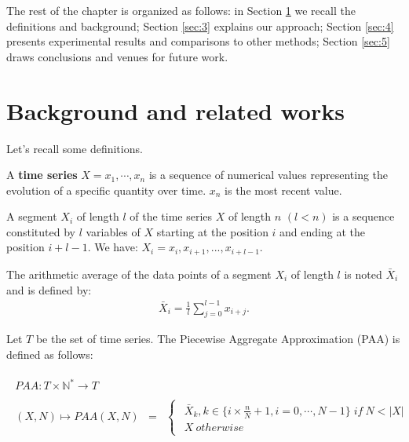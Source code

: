 The rest of the chapter is organized as follows: in Section
\ref{sec:1} we recall the definitions and background; Section \ref{sec:3} explains our approach;
Section \ref{sec:4} presents experimental results and comparisons to other methods; Section
\ref{sec:5} draws conclusions and venues for future work.   




\section{Background and related works}
\label{sec:1}
Let's recall some definitions.

\begin{definition}
A \textbf{time series}
$X=x_{1},\cdots,x_{n}$ is a sequence of numerical values representing the evolution of a specific quantity over time. $x_{n}$ is the most recent value.
\end{definition}

\begin{definition}
A segment  $X_{i}$ of length  $l$ of the time series $X$ of length $n$
$(l<n)$ is a sequence constituted by $l$  variables of $X$ starting at the position $i$ and ending at the position $i+l-1$.
We have: $X_{i}=x_{i},x_{i+1},...,x_{i+l-1}$.
\end{definition}

\begin{definition}
The arithmetic average of the data points of a segment  $X_{i}$ of length
$l$ is noted $\bar{X}_{i}$ and is defined by:
\begin{eqnarray}
\bar{X}_{i}=\frac{1}{l}\sum_{j=0}^{l-1}x_{i+j}.
\end{eqnarray}
\end{definition}


\begin{definition}

Let $T$ be the set of time series. The Piecewise Aggregate Approximation (PAA) is defined as follows:

\begin{eqnarray}
\begin{array}{ccc}
 PAA: T\times\mathbb{N^{*}}\rightarrow T\\
\\
(X,N)\mapsto PAA(X,N) & = &
 \begin{cases}
 \begin{array}{c}
\bar{X}_{k}, k \in \{i\times\frac{n}{N} + 1, i=0,\cdots , N-1\}\;if\:N<|X|\\
X\:otherwise
\end{array}
\end{cases}
\end{array}
\end{eqnarray}

\end{definition}

